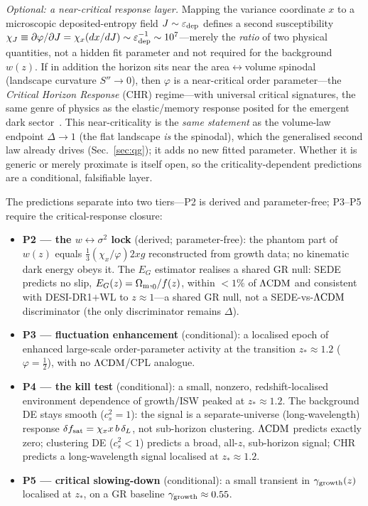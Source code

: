 \emph{Optional: a near-critical response layer.} Mapping the variance coordinate $x$ to a microscopic
deposited-entropy field $J\sim\varepsilon_{\rm dep}$ defines a second susceptibility
$\chi_J\equiv\partial\varphi/\partial J=\chi_x(dx/dJ)\sim\varepsilon_{\rm dep}^{-1}\sim10^7$---merely the
\emph{ratio} of two physical quantities, not a hidden fit parameter and not required for the background
$w(z)$. If in addition the horizon sits near the area$\leftrightarrow$volume spinodal (landscape
curvature $S''\to0$), then $\varphi$ is a near-critical order parameter---the \emph{Critical Horizon
Response} (CHR) regime---with universal critical signatures, the same genre of physics as the
elastic/memory response posited for the emergent dark sector~\cite{Verlinde:2016toy}. This
near-criticality is the \emph{same statement} as the volume-law endpoint $\Delta\to1$ (the flat
landscape \emph{is} the spinodal), which the generalised second law already drives
(Sec.~\ref{sec:qg}); it adds no new fitted parameter. Whether it is generic or merely proximate is
itself open, so the criticality-dependent predictions are a conditional, falsifiable layer.

The predictions separate into two tiers---P2 is derived and parameter-free; P3--P5 require the
critical-response closure:
\begin{itemize}
\item \textbf{P2 --- the $w\leftrightarrow\sigma^2$ lock} (derived; parameter-free): the phantom part of
$w(z)$ equals $\tfrac13(\chi_x/\varphi)2xg$ reconstructed from growth data; no kinematic dark energy
obeys it. The $E_G$ estimator realises a shared GR null: SEDE predicts no slip,
$E_G(z)=\Omega_{\mathrm m}{,}_0/f(z)$, within $<1\%$ of $\Lambda\mathrm{CDM}$ and consistent with DESI-DR1$+$WL to $z\approx1$---a
shared GR null, not a SEDE-vs-$\Lambda\mathrm{CDM}$ discriminator (the only discriminator remains $\Delta$).
\item \textbf{P3 --- fluctuation enhancement} (conditional): a localised epoch of enhanced large-scale
order-parameter activity at the transition $z_\ast\approx1.2$ ($\varphi=\tfrac12$), with no
$\Lambda\mathrm{CDM}$/CPL analogue.
\item \textbf{P4 --- the kill test} (conditional): a small, nonzero, redshift-localised environment
dependence of growth/ISW peaked at $z_\ast\approx1.2$. The background DE stays smooth ($c_s^2=1$): the
signal is a separate-universe (long-wavelength) response $\delta f_{\mathrm{sat}}=\chi_x x\,b\,\delta_L$, not
sub-horizon clustering. $\Lambda\mathrm{CDM}$ predicts exactly zero; clustering DE ($c_s^2<1$) predicts a broad,
all-$z$, sub-horizon signal; CHR predicts a long-wavelength signal localised at $z_\ast\approx1.2$.
\item \textbf{P5 --- critical slowing-down} (conditional): a small transient in $\gamma_{\rm
growth}(z)$ localised at $z_\ast$, on a GR baseline $\gamma_{\rm growth}\approx0.55$.
\end{itemize}

